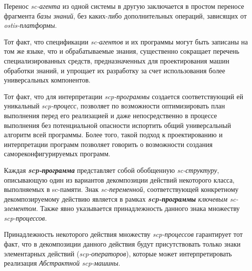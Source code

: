 \begin{frame}{}
\topline
\justifying
\vspace{10mm}
\small

\begin{textitemize}
    \item Перенос \textit{sc-агента} из одной системы в другую заключается в простом переносе фрагмента \textit{базы знаний}, без каких-либо дополнительных операций, зависящих от \textit{ostis-платформы}.
	\item Тот факт, что спецификации \textit{sc-агентов} и их программы могут быть записаны на том же языке, что и обрабатываемые знания, существенно сокращает перечень специализированных средств, предназначенных для проектирования машин обработки знаний, и упрощает их разработку за счет использования более универсальных компонентов.
	\item Тот факт, что для интерпретации \textit{scp-программы} создается соответствующий ей уникальный \textit{\mbox{scp-процесс}}, позволяет по возможности оптимизировать план выполнения перед его реализацией и даже непосредственно в процессе выполнения без потенциальной опасности испортить общий универсальный алгоритм всей программы. Более того, такой подход к проектированию и интерпретации программ позволяет говорить о возможности создания самореконфигурируемых программ.
\end{textitemize}
\end{frame}

\begin{frame}{}
\topline
\justifying
\vspace{10mm}

Каждая \textbf{\textit{scp-программа}} представляет собой обобщенную \textit{sc-структуру}, описывающую один из вариантов декомпозиции действий некоторого класса, выполняемых в sc-памяти. Знак \textit{sc-переменной}, соответствующей конкретному декомпозируемому действию является в рамках \textbf{\textit{scp-программы}} \textit{ключевым sc-элементом\scnrolesign}. Также явно указывается принадлежность данного знака множеству \textit{scp-процессов}.
	
Принадлежность некоторого действия множеству \textit{scp-процессов} гарантирует тот факт, что в декомпозиции данного действия будут присутствовать только знаки элементарных действий (\textit{scp-операторов}), которые может интерпретировать реализация \textit{Абстрактной scp-машины}.
\end{frame}

